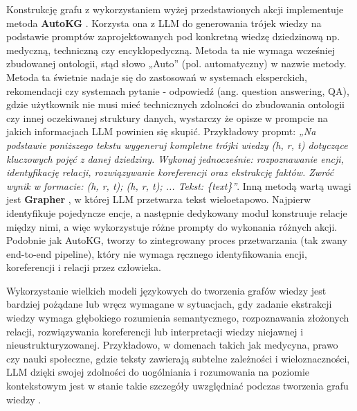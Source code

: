 \documentclass[
a4paper,
12pt,
]{article}
\begin{document}
Konstrukcję grafu z wykorzystaniem wyżej przedstawionych akcji implementuje metoda \textbf{AutoKG} \cite{kg:autoKG}. Korzysta ona z LLM do generowania trójek wiedzy na podstawie promptów zaprojektowanych pod konkretną wiedzę dziedzinową np. medyczną, techniczną czy encyklopedyczną. 
Metoda ta nie wymaga wcześniej zbudowanej ontologii, stąd słowo „Auto” (pol. automatyczny) w nazwie metody. 
Metoda ta świetnie nadaje się do zastosowań w systemach eksperckich, rekomendacji czy systemach pytanie - odpowiedź (ang. question answering, QA), gdzie użytkownik nie musi mieć technicznych zdolności do zbudowania ontologii czy innej oczekiwanej struktury danych, wystarczy że opisze w prompcie na jakich informacjach LLM powinien się skupić. 
Przykładowy propmt: \textit{„Na podstawie poniższego tekstu wygeneruj kompletne trójki wiedzy \textup{(}h, r, t\textup{)} dotyczące kluczowych pojęć z danej dziedziny. Wykonaj jednocześnie: rozpoznawanie encji, identyfikację relacji, rozwiązywanie koreferencji oraz ekstrakcję faktów. Zwróć wynik w formacie:
\textup{(}h, r, t\textup{)}; \textup{(}h, r, t\textup{)}; ...
Tekst: \{text\}”}.
Inną metodą wartą uwagi jest \textbf{Grapher} \cite{kg:grapher}, w której LLM przetwarza tekst wieloetapowo. Najpierw identyfikuje pojedyncze encje, a następnie dedykowany moduł konstruuje relacje między nimi, a więc wykorzystuje różne prompty do wykonania różnych akcji. Podobnie jak AutoKG, tworzy to zintegrowany proces przetwarzania (tak zwany end-to-end pipeline), który nie wymaga ręcznego identyfikowania encji, koreferencji i relacji przez człowieka.


Wykorzystanie wielkich modeli językowych do tworzenia grafów wiedzy jest bardziej pożądane lub wręcz wymagane w sytuacjach, gdy zadanie ekstrakcji wiedzy wymaga głębokiego rozumienia semantycznego, rozpoznawania złożonych relacji, rozwiązywania koreferencji lub interpretacji wiedzy niejawnej i nieustrukturyzowanej. Przykładowo, w domenach takich jak medycyna, prawo czy nauki społeczne, gdzie teksty zawierają subtelne zależności i wieloznaczności, LLM dzięki swojej zdolności do uogólniania i rozumowania na poziomie kontekstowym jest w stanie takie szczegóły uwzględniać podczas tworzenia grafu wiedzy \cite{kgllm:construction}.
\end{document}
